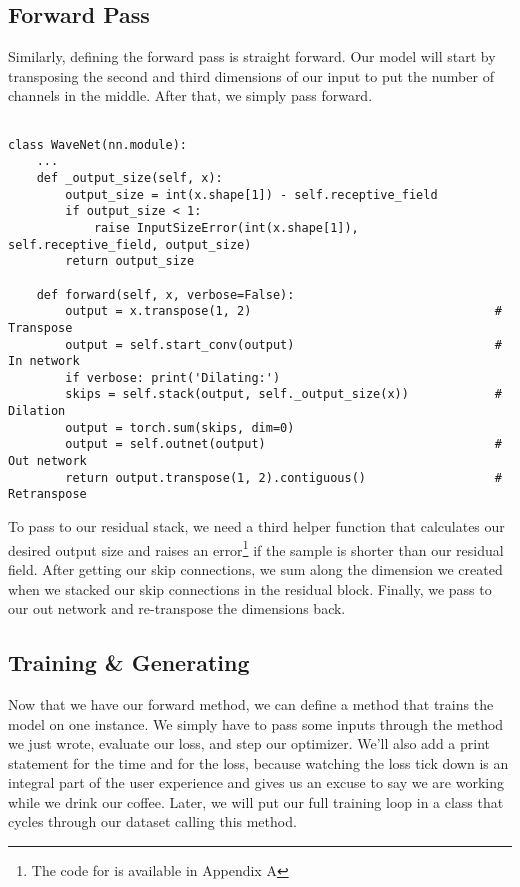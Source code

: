 \subsection{Forward Pass}

Similarly, defining the forward pass is straight forward. Our model will start by transposing the second and third dimensions of our input to put the number of channels in the middle. After that, we simply pass forward. 

\begin{verbatim}

class WaveNet(nn.module):        
    ...
    def _output_size(self, x):
        output_size = int(x.shape[1]) - self.receptive_field
        if output_size < 1: 
            raise InputSizeError(int(x.shape[1]), self.receptive_field, output_size)
        return output_size
        
    def forward(self, x, verbose=False):
        output = x.transpose(1, 2)                                  # Transpose
        output = self.start_conv(output)                            # In network
        if verbose: print('Dilating:')
        skips = self.stack(output, self._output_size(x))            # Dilation
        output = torch.sum(skips, dim=0)
        output = self.outnet(output)                                # Out network
        return output.transpose(1, 2).contiguous()                  # Retranspose
\end{verbatim}

\newpage
To pass to our residual stack, we need a third helper function that calculates our desired output size and raises an error\footnote{The code for  is available in Appendix A} if the sample is shorter than our residual field. After getting our skip connections, we sum along the dimension we created when we stacked our skip connections in the residual block. Finally, we pass to our out network and re-transpose the dimensions back.

\subsection{Training \& Generating}

Now that we have our forward method, we can define a method that trains the model on one instance. We simply have to pass some inputs through the  method we just wrote, evaluate our loss, and step our optimizer. We'll also add a print statement for the time and for the loss, because watching the loss tick down is an integral part of the user experience and gives us an excuse to say we are working while we drink our coffee. Later, we will put our full training loop in a class that cycles through our dataset calling this method.

